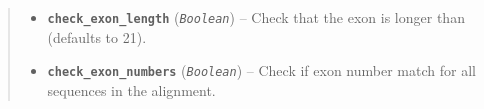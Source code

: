 \documentclass[letterpaper,10pt,english]{sphinxmanual}
\begin{document}
\begin{fulllineitems}
\begin{quote}
\begin{description}
\begin{itemize}
\item {} 
\textbf{\texttt{check\_exon\_length}} (\emph{\texttt{Boolean}}) -- Check that the exon is
longer than  (defaults to 21).

\item {} 
\textbf{\texttt{check\_exon\_numbers}} (\emph{\texttt{Boolean}}) -- Check if exon number match
for all sequences in the alignment.

\end{itemize}

\end{description}\end{quote}

\end{fulllineitems}

\end{document}
